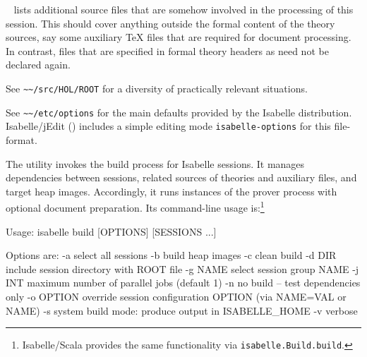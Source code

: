\begin{isabellebody}
\begin{isamarkuptext}
\begin{description}
  \item {}~ lists additional source
  files that are somehow involved in the processing of this session.
  This should cover anything outside the formal content of the theory
  sources, say some auxiliary {\TeX} files that are required for
  document processing.  In contrast, files that are specified in
  formal theory headers as \hyperlink{keyword.uses}{\mbox{}} need not be declared
  again.

  \end{description}%
\end{isamarkuptext}%
\isamarkuptrue%
%
\isamarkuptrue%
%
\begin{isamarkuptext}%
See \verb|~~/src/HOL/ROOT| for a diversity of practically
  relevant situations.%
\end{isamarkuptext}%
\isamarkuptrue%
%
\isamarkuptrue%
%
\begin{isamarkuptext}%
See \verb|~~/etc/options| for the main defaults provided by
  the Isabelle distribution.  Isabelle/jEdit ()
  includes a simple editing mode \verb|isabelle-options| for
  this file-format.%
\end{isamarkuptext}%
\isamarkuptrue%
%
\isamarkuptrue%
%
\begin{isamarkuptext}%
The \hypertarget{tool.build}{\hyperlink{tool.build}{\mbox{}}} utility invokes the build process for
  Isabelle sessions.  It manages dependencies between sessions,
  related sources of theories and auxiliary files, and target heap
  images.  Accordingly, it runs instances of the prover process with
  optional document preparation.  Its command-line usage
  is:\footnote{Isabelle/Scala provides the same functionality via
  \texttt{isabelle.Build.build}.}
\begin{ttbox} Usage: isabelle build [OPTIONS] [SESSIONS ...]

  Options are:
    -a           select all sessions
    -b           build heap images
    -c           clean build
    -d DIR       include session directory with ROOT file
    -g NAME      select session group NAME
    -j INT       maximum number of parallel jobs (default 1)
    -n           no build -- test dependencies only
    -o OPTION    override session configuration OPTION
                 (via NAME=VAL or NAME)
    -s           system build mode: produce output in ISABELLE_HOME
    -v           verbose


\end{ttbox}
\end{isamarkuptext}
\end{isabellebody}
